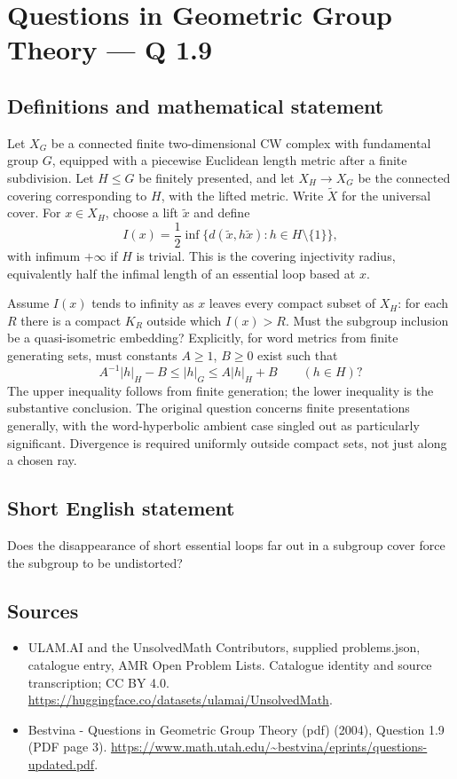 \documentclass[11pt,a4paper]{article}
\begin{document}
\section*{Questions in Geometric Group Theory — Q 1.9}\label{statement}

\subsection{Definitions and mathematical statement}
Let $X_G$ be a connected finite two-dimensional CW complex with fundamental group $G$, equipped with a piecewise Euclidean length metric after a finite subdivision. Let $H\leq G$ be finitely presented, and let $X_H\to X_G$ be the connected covering corresponding to $H$, with the lifted metric. Write $\widetilde X$ for the universal cover. For $x\in X_H$, choose a lift $\widetilde x$ and define
\[
 I(x)=\frac12\inf\{d(\widetilde x,h\widetilde x):h\in H\setminus\{1\}\},
\]
with infimum $+\infty$ if $H$ is trivial. This is the covering injectivity radius, equivalently half the infimal length of an essential loop based at $x$.

Assume $I(x)$ tends to infinity as $x$ leaves every compact subset of $X_H$: for each $R$ there is a compact $K_R$ outside which $I(x)>R$. Must the subgroup inclusion be a quasi-isometric embedding? Explicitly, for word metrics from finite generating sets, must constants $A\geq1$, $B\geq0$ exist such that
\[
 A^{-1}|h|_H-B\leq |h|_G\leq A|h|_H+B\qquad(h\in H)?
\]
The upper inequality follows from finite generation; the lower inequality is the substantive conclusion. The original question concerns finite presentations generally, with the word-hyperbolic ambient case singled out as particularly significant. Divergence is required uniformly outside compact sets, not just along a chosen ray.
\subsection{Short English statement}
Does the disappearance of short essential loops far out in a subgroup cover force the subgroup to be undistorted?
\subsection{Sources}
\begin{itemize}
\item[S1] ULAM.AI and the UnsolvedMath Contributors, supplied problems.json, catalogue entry, AMR Open Problem Lists. Catalogue identity and source transcription; CC BY 4.0.
\url{https://huggingface.co/datasets/ulamai/UnsolvedMath}.
\item[S2] Bestvina - Questions in Geometric Group Theory (pdf) (2004), Question 1.9 (PDF page 3). 
\url{https://www.math.utah.edu/~bestvina/eprints/questions-updated.pdf}.
\end{itemize}
\end{document}
